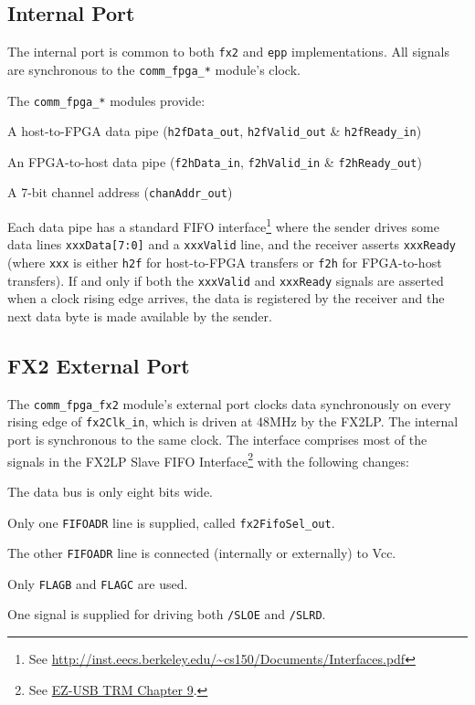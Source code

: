\subsection{Internal Port}
The internal port is common to both \texttt{fx2} and \texttt{epp} implementations. All signals are synchronous to the \texttt{comm\_fpga\_*} module's clock.


The \texttt{comm\_fpga\_*} modules provide:

\begin{blobs}
  \item A host-to-FPGA data pipe (\texttt{h2fData\_out}, \texttt{h2fValid\_out} \& \texttt{h2fReady\_in})
  \item An FPGA-to-host data pipe (\texttt{f2hData\_in}, \texttt{f2hValid\_in} \& \texttt{f2hReady\_out})
  \item A 7-bit channel address (\texttt{chanAddr\_out})
\end{blobs}

Each data pipe has a standard FIFO interface\footnote{See \url{http://inst.eecs.berkeley.edu/~cs150/Documents/Interfaces.pdf}} where the sender drives some data lines \texttt{xxxData[7:0]} and a \texttt{xxxValid} line, and the receiver asserts \texttt{xxxReady} (where \texttt{xxx} is either \texttt{h2f} for host-to-FPGA transfers or \texttt{f2h} for FPGA-to-host transfers). If and only if both the \texttt{xxxValid} and \texttt{xxxReady} signals are asserted when a clock rising edge arrives, the data is registered by the receiver and the next data byte is made available by the sender.

\subsection{FX2 External Port}
The \texttt{comm\_fpga\_fx2} module's external port clocks data synchronously on every rising edge of \texttt{fx2Clk\_in}, which is driven at 48MHz by the FX2LP. The internal port is synchronous to the same clock. The interface comprises most of the signals in the FX2LP Slave FIFO Interface\footnote{See \href{http://www.cypress.com/?docID=27095}{EZ-USB TRM Chapter 9}.} with the following changes:

\begin{blobs}
  \item The data bus is only eight bits wide.
  \item Only one \texttt{FIFOADR} line is supplied, called \texttt{fx2FifoSel\_out}.
  \item The other \texttt{FIFOADR} line is connected (internally or externally) to Vcc.
  \item Only \texttt{FLAGB} and \texttt{FLAGC} are used.
  \item One signal is supplied for driving both \texttt{/SLOE} and \texttt{/SLRD}.
\end{blobs}

